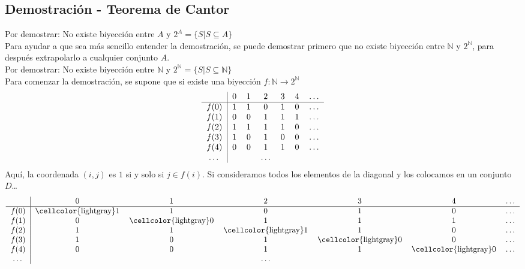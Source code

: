 \documentclass[../main.tex]{subfiles}
\begin{document}
\subsection{Demostración - Teorema de Cantor}
Por demostrar: No existe biyección entre $A$ y $2^A = \{ S | S \subseteq A \}$\\
Para ayudar a que sea más sencillo entender la demostración, se puede demostrar primero que no existe biyección entre $\mathds{N}$ y $2^{\mathds{N}}$, para después extrapolarlo a cualquier conjunto $A$.\\
Por demostrar: No existe biyección entre $\mathds{N}$ y $2^{\mathds{N}} = \{ S | S \subseteq \mathds{N} \}$\\
Para comenzar la demostración, se supone que si existe una biyección $f: \mathds{N} \rightarrow 2^{\mathds{N}}$
\[
    \begin{tabular}{c|cccccc}
        \text{} & $0$ & $1$ & $2$ & $3$ & $4$ & $\ldots$\\\hline
        $f(0)$ & $1$ & $1$ & $0$ & $1$ & $0$ & $\ldots$\\
        $f(1)$ & $0$ & $0$ & $1$ & $1$ & $1$ & $\ldots$\\
        $f(2)$ & $1$ & $1$ & $1$ & $1$ & $0$ & $\ldots$\\
        $f(3)$ & $1$ & $0$ & $1$ & $0$ & $0$ & $\ldots$\\
        $f(4)$ & $0$ & $0$ & $1$ & $1$ & $0$ & $\ldots$\\
        $\dots$ & & & $\ldots$ & & &
    \end{tabular}
\]
Aquí, la coordenada $(i,j)$ es $1$ si y solo si $j \in f(i)$.
Si consideramos todos los elementos de la diagonal y los colocamos en un conjunto $D$\dots
\[
    \begin{tabular}{c|cccccc}
        \text{} & $0$ & $1$ & $2$ & $3$ & $4$ & $\ldots$\\\hline
        $f(0)$ & \cellcolor{lightgray}$1$ & $1$ & $0$ & $1$ & $0$ & $\ldots$\\
        $f(1)$ & $0$ & \cellcolor{lightgray}$0$ & $1$ & $1$ & $1$ & $\ldots$\\
        $f(2)$ & $1$ & $1$ & \cellcolor{lightgray}$1$ & $1$ & $0$ & $\ldots$\\
        $f(3)$ & $1$ & $0$ & $1$ & \cellcolor{lightgray}$0$ & $0$ & $\ldots$\\
        $f(4)$ & $0$ & $0$ & $1$ & $1$ & \cellcolor{lightgray}$0$ & $\ldots$\\
        $\dots$ & & & $\ldots$ & & &
    \end{tabular}
\]
\end{document}
